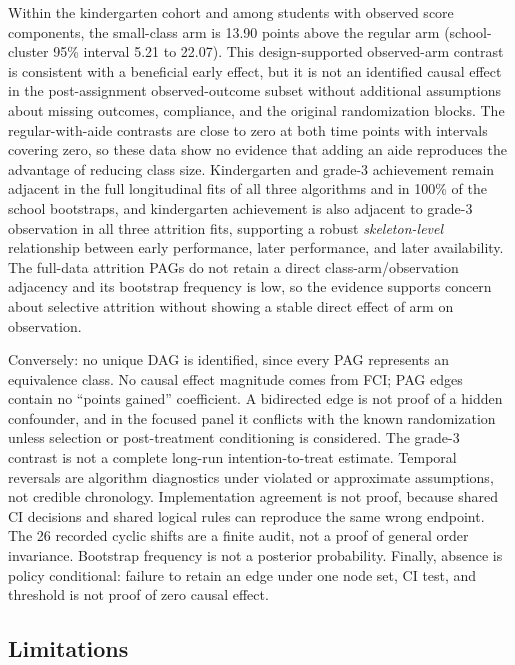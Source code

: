 \documentclass[11pt,a4paper]{article}
\begin{document}
Within the kindergarten cohort and among students with observed score
components, the small-class arm is 13.90 points above the regular arm
(school-cluster 95\% interval 5.21 to 22.07). This design-supported observed-arm
contrast is consistent with a beneficial early effect, but it is not an
identified causal effect in the post-assignment observed-outcome subset without
additional assumptions about missing outcomes, compliance, and the original
randomization blocks. The regular-with-aide contrasts are close to zero at both
time points with intervals covering zero, so these data show no evidence that
adding an aide reproduces the advantage of reducing class size. Kindergarten and
grade-3 achievement remain adjacent in the full longitudinal fits of all three
algorithms and in 100\% of the school bootstraps, and kindergarten achievement
is also adjacent to grade-3 observation in all three attrition fits, supporting
a robust \emph{skeleton-level} relationship between early performance, later
performance, and later availability. The full-data attrition PAGs do not retain
a direct class-arm/observation adjacency and its bootstrap frequency is low, so
the evidence supports concern about selective attrition without showing a stable
direct effect of arm on observation.

Conversely: no unique DAG is identified, since every PAG represents an
equivalence class. No causal effect magnitude comes from FCI; PAG edges contain
no ``points gained'' coefficient. A bidirected edge is not proof of a hidden
confounder, and in the focused panel it conflicts with the known randomization
unless selection or post-treatment conditioning is considered. The grade-3
contrast is not a complete long-run intention-to-treat estimate. Temporal
reversals are algorithm diagnostics under violated or approximate assumptions,
not credible chronology. Implementation agreement is not proof, because shared
CI decisions and shared logical rules can reproduce the same wrong endpoint. The
26 recorded cyclic shifts are a finite audit, not a proof of general order
invariance. Bootstrap frequency is not a posterior probability. Finally, absence
is policy conditional: failure to retain an edge under one node set, CI test,
and threshold is not proof of zero causal effect.

\subsection{Limitations}
\end{document}
